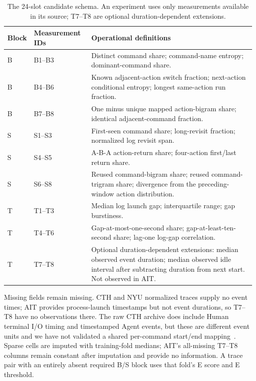 \documentclass[10pt]{article}
\begin{document}
\begin{table}[ht]
\centering\footnotesize
\caption{The 24-slot candidate schema. An experiment uses only measurements available in its source; T7--T8 are optional duration-dependent extensions.}
\begin{tabularx}{\linewidth}{@{}p{.09\linewidth}p{.28\linewidth}Y@{}}
\toprule Block & Measurement IDs & Operational definitions \\
\midrule
B & B1--B3 & Distinct command share; command-name entropy; dominant-command share. \\
B & B4--B6 & Known adjacent-action switch fraction; next-action conditional entropy; longest same-action run fraction. \\
B & B7--B8 & One minus unique mapped action-bigram share; identical adjacent-command fraction. \\
S & S1--S3 & First-seen command share; long-revisit fraction; normalized log revisit span. \\
S & S4--S5 & A-B-A action-return share; four-action first/last return share. \\
S & S6--S8 & Reused command-bigram share; reused command-trigram share; divergence from the preceding-window action distribution. \\
T & T1--T3 & Median log launch gap; interquartile range; gap burstiness. \\
T & T4--T6 & Gap-at-most-one-second share; gap-at-least-ten-second share; lag-one log-gap correlation. \\
T & T7--T8 & Optional duration-dependent extensions: median observed event duration; median observed idle interval after subtracting duration from next start. Not observed in AIT. \\
\bottomrule
\end{tabularx}
\end{table}

Missing fields remain missing. CTH and NYU normalized traces supply no event times; AIT provides process-launch timestamps but not event durations, so T7--T8 have no observations there. The raw CTH archive does include Human terminal I/O timing and timestamped Agent events, but these are different event units and we have not validated a shared per-command start/end mapping~\cite{cth,inspect}. Sparse cells are imputed with training-fold medians; AIT's all-missing T7--T8 columns remain constant after imputation and provide no information. A trace pair with an entirely absent required B/S block uses that fold's E score and E threshold.
\end{document}
